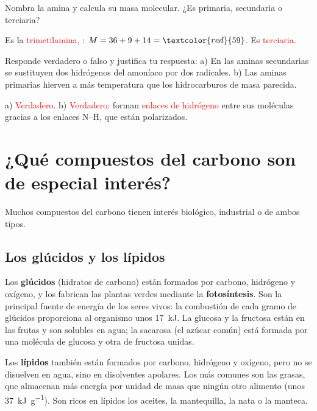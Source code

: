 \begin{exercise}
    Nombra la amina  y calcula su masa molecular. ¿Es primaria, secundaria o terciaria?
    \begin{solu}
        Es la \textcolor{red}{trimetilamina}, : \(M = 36 + 9 + 14 = \textcolor{red}{59}\). Es \textcolor{red}{terciaria}.
    \end{solu}
\end{exercise}

\begin{exercise}
    Responde verdadero o falso y justifica tu respuesta: a) En las aminas secundarias se sustituyen dos hidrógenos del amoníaco por dos radicales. b) Las aminas primarias hierven a más temperatura que los hidrocarburos de masa parecida.
    \begin{solu}
        a) \textcolor{red}{Verdadero}. b) \textcolor{red}{Verdadero}: forman \textcolor{red}{enlaces de hidrógeno} entre sus moléculas gracias a los enlaces N--H, que están polarizados.
    \end{solu}
\end{exercise}

\section[Compuestos del carbono de especial interés]{¿Qué compuestos del carbono son de especial interés?}

Muchos compuestos del carbono tienen interés biológico, industrial o de ambos tipos.

\subsection{Los glúcidos y los lípidos}

Los \textbf{glúcidos} (hidratos de carbono) están formados por carbono, hidrógeno y oxígeno, y los fabrican las plantas verdes mediante la \textbf{fotosíntesis}. Son la principal fuente de energía de los seres vivos: la combustión de cada gramo de glúcidos proporciona al organismo unos \qty{17}{\kilo\joule}. La glucosa y la fructosa están en las frutas y son solubles en agua; la sacarosa (el azúcar común) está formada por una molécula de glucosa y otra de fructosa unidas.

Los \textbf{lípidos} también están formados por carbono, hidrógeno y oxígeno, pero no se disuelven en agua, sino en disolventes apolares. Los más comunes son las grasas, que almacenan más energía por unidad de masa que ningún otro alimento (unos \qty{37}{\kilo\joule\per\gram}). Son ricos en lípidos los aceites, la mantequilla, la nata o la manteca.

